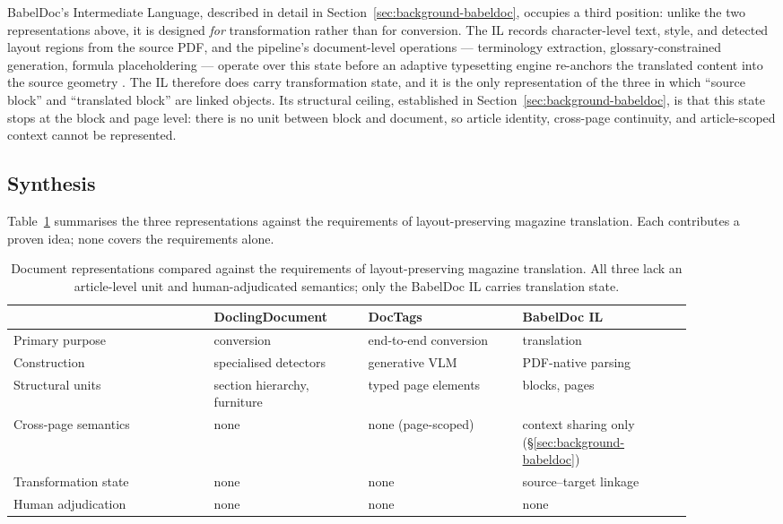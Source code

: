 BabelDoc's Intermediate Language, described in detail in
Section~\ref{sec:background-babeldoc}, occupies a third position: unlike the two
representations above, it is designed \emph{for} transformation rather
than for conversion. The IL records character-level text, style, and
detected layout regions from the source PDF, and the pipeline's
document-level operations --- terminology extraction,
glossary-constrained generation, formula placeholdering --- operate
over this state before an adaptive typesetting engine re-anchors the
translated content into the source geometry \cite{qi2026babeldoc}. The
IL therefore does carry transformation state, and it is the only
representation of the three in which ``source block'' and ``translated
block'' are linked objects. Its structural ceiling, established in
Section~\ref{sec:background-babeldoc}, is that this state stops at the block and
page level: there is no unit between block and document, so article
identity, cross-page continuity, and article-scoped context cannot be
represented.

\subsection{Synthesis}

Table~\ref{tab:ir-comparison} summarises the three representations
against the requirements of layout-preserving magazine translation.
Each contributes a proven idea; none covers the requirements alone.

\begin{table}[tb]
\centering
\small
\begin{tabular}{p{0.26\linewidth}p{0.20\linewidth}p{0.20\linewidth}p{0.22\linewidth}}
\hline
 & \textbf{DoclingDocument} & \textbf{DocTags} & \textbf{BabelDoc IL} \\
\hline
Primary purpose & conversion & end-to-end conversion & translation \\
Construction & specialised detectors & generative VLM & PDF-native parsing \\
Structural units & section hierarchy, furniture & typed page elements & blocks, pages \\
Cross-page semantics & none & none (page-scoped) & context sharing only (\S\ref{sec:background-babeldoc}) \\
Transformation state & none & none & source--target linkage \\
Human adjudication & none & none & none \\
\hline
\end{tabular}
\caption{Document representations compared against the requirements of
layout-preserving magazine translation. All three lack an article-level
unit and human-adjudicated semantics; only the BabelDoc IL carries
translation state.}
\label{tab:ir-comparison}
\end{table}

